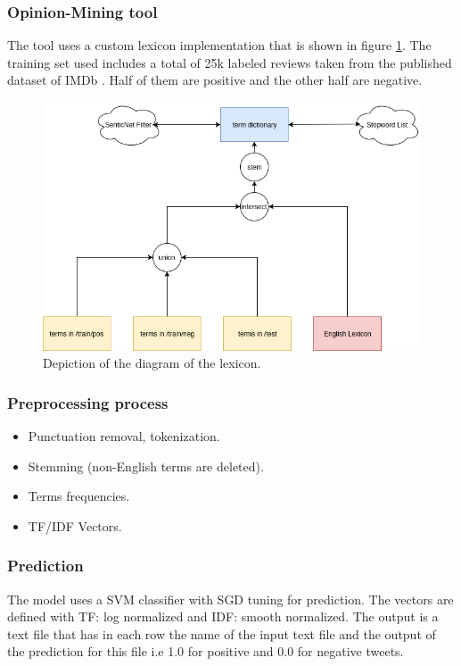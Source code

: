 \documentclass[12pt,svgnames]{report}
\begin{document}
\subsubsection{Opinion-Mining tool}
The tool uses a custom lexicon implementation that is shown in figure \ref{fig:opinion}. The training set used includes a total of 25k labeled reviews taken from the published dataset of IMDb \cite{imdb}. Half of them are positive and the other half are negative.
\begin{figure}[h]
	\centering
	\includegraphics{opinion}
	\caption{Depiction of the diagram of the lexicon.}
	\label{fig:opinion}
\end{figure}

\subsubsection{Preprocessing process}
\begin{itemize}
	\item Punctuation removal, tokenization.
	\item Stemming (non-English terms are deleted).
	\item Terms frequencies.
	\item TF/IDF Vectors.
\end{itemize}

\subsubsection{Prediction}
The model uses a SVM classifier with SGD tuning for prediction. The vectors are defined with TF: log normalized and IDF: smooth normalized. The output is a text file that has in each row the name of the input text file and the output of the prediction for this file i.e 1.0 for positive and 0.0 for negative tweets.
\end{document}
